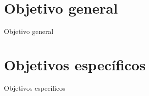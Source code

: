 \documentclass{standalone}
\begin{document}
	\section*{Objetivo general}
	Objetivo general
	
	\section*{Objetivos espec\'ificos}
	Objetivos espec\'ificos
\end{document}
